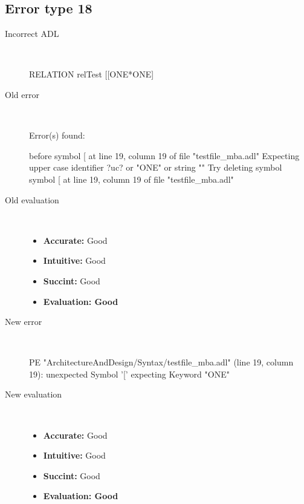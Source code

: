\hrulefill

\subsection{Error type 18}
  \begin{description}
  \item[Incorrect ADL]~\\
\begin{adl}
RELATION relTest [[ONE*ONE]\end{adl}
  \item[Old error]~\\
\begin{haskell}
Error(s) found:

before symbol [ at line 19, column 19 of file "testfile_mba.adl"
Expecting upper case identifier ?uc? or "ONE" or string ""
Try deleting symbol symbol [ at line 19, column 19 of file "testfile_mba.adl"
\end{haskell}
  \item[Old evaluation]~\\
    \begin{itemize}
    \item \textbf{Accurate:} Good
    \item \textbf{Intuitive:} Good
    \item \textbf{Succint:} Good
    \item \textbf{Evaluation: Good}
    \end{itemize}
  \item[New error]~\\
\begin{haskell}
PE "ArchitectureAndDesign/Syntax/testfile_mba.adl" (line 19, column 19):
unexpected Symbol '['
expecting Keyword "ONE"\end{haskell}
  \item[New evaluation]~\\
    \begin{itemize}
    \item \textbf{Accurate:} Good
    \item \textbf{Intuitive:} Good
    \item \textbf{Succint:} Good
    \item \textbf{Evaluation: Good
}
    \end{itemize}
  \end{description}

\hrulefill

